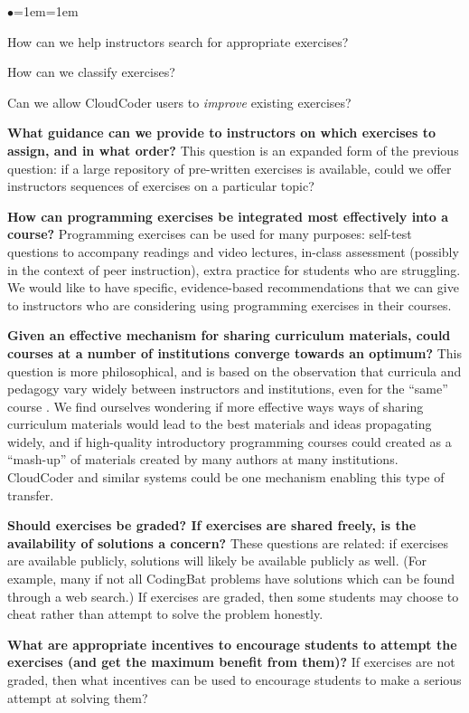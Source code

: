 \documentclass{sig-alternate}
\newenvironment{denseItemize}{%
\begin{list}{$\bullet$}{\setlength{\itemsep}{0in}\setlength{\parsep}{0in}\leftmargin=1em\labelwidth=1em}}{\end{list}}
\begin{document}
\begin{denseItemize}
\item How can we help instructors search for appropriate exercises?
\item How can we classify exercises?
\item Can we allow CloudCoder users to {\em improve} existing exercises?
\end{denseItemize}

{\bf What guidance can we provide to instructors on which exercises to assign,
and in what order?}  This question is an expanded form of the previous question:
if a large repository of pre-written exercises is available,
could we offer instructors sequences of exercises on a particular topic?

{\bf How can programming exercises be integrated most effectively into a course?}
Programming exercises can be used for many purposes: self-test questions
to accompany readings and video lectures, in-class assessment (possibly
in the context of peer instruction), extra practice for students who
are struggling.  We would like to have specific, evidence-based recommendations
that we can give to instructors who are considering using programming
exercises in their courses.

{\bf Given an effective mechanism for sharing curriculum materials, could
courses at a number of institutions converge towards an optimum?}
This question is more philosophical, and is based on the observation that
curricula and pedagogy vary widely between instructors and institutions,
even for the ``same'' course \cite{Hertz:2010:CCM:1734263.1734335}.  We find ourselves wondering
if more effective ways ways of sharing curriculum materials would lead
to the best materials and ideas propagating widely, and if high-quality introductory
programming courses could created as a ``mash-up'' of materials created by
many authors at many institutions.  CloudCoder and similar systems
could be one mechanism enabling this type of transfer.

{\bf Should exercises be graded?
If exercises are shared freely, is the availability of solutions a concern?}
These questions are related: if exercises are available publicly,
solutions will likely be available publicly as well.  (For example,
many if not all CodingBat problems have solutions which can be found
through a web search.)  If exercises are graded, then some students may
choose to cheat rather than attempt to solve the problem honestly.

{\bf What are appropriate incentives to encourage students to attempt
the exercises (and get the maximum benefit from them)?}
If exercises are not graded, then what incentives can be used to
encourage students to make a serious attempt at solving them?
\end{document}

